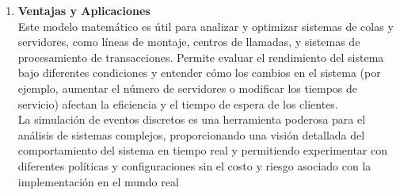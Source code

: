 \documentclass[article]{amsart}
\begin{document}
\begin{enumerate}
\item \textbf{Ventajas y Aplicaciones}\\

Este modelo matemático es útil para analizar y optimizar sistemas de colas y servidores, como líneas de montaje, centros de llamadas, y sistemas de procesamiento de transacciones. Permite evaluar el rendimiento del sistema bajo diferentes condiciones y entender cómo los cambios en el sistema (por ejemplo, aumentar el número de servidores o modificar los tiempos de servicio) afectan la eficiencia y el tiempo de espera de los clientes.\\

La simulación de eventos discretos es una herramienta poderosa para el análisis de sistemas complejos, proporcionando una visión detallada del comportamiento del sistema en tiempo real y permitiendo experimentar con diferentes políticas y configuraciones sin el costo y riesgo asociado con la implementación en el mundo real\\



\end{enumerate}
\end{document}

